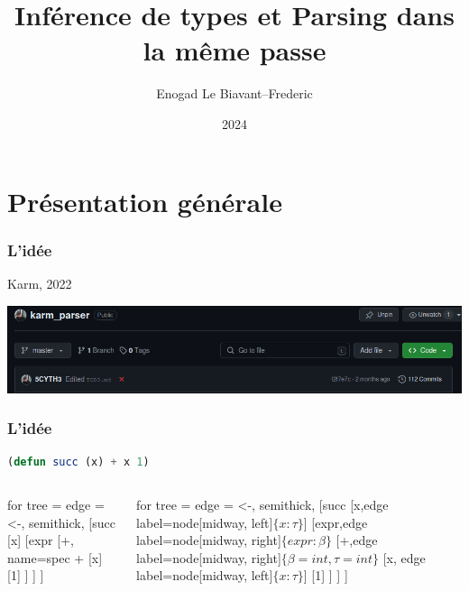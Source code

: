 \documentclass{beamer}
\title{Inférence de types et Parsing dans la même passe}
\author{Enogad Le Biavant--Frederic}
\institute{Alain René Lesage MP2I}
\date{2024}
\begin{document}
\frame{\titlepage}

\section{Présentation générale}
\begin{frame}
		\frametitle{L'idée}
		Karm, 2022
		\begin{center}
				\includegraphics[scale=0.25]{repo}
		\end{center}
		
\end{frame}

\begin{frame}[fragile]
		\frametitle{L'idée}
		\begin{lstlisting}[language=Lisp]
(defun succ (x) + x 1)
		\end{lstlisting}
		\begin{columns}
				\begin{column}{0.5\textwidth}
						\begin{center}
						\begin{forest}
								for tree = {
										edge = {<-, semithick},
								}
								[succ
										[x]
										[expr
												[+, name=spec +
														[x]
														[1]	
												]
										]
								]
						\end{forest}
						\end{center}
				\end{column}
				\begin{column}{0.5\textwidth}
						\begin{center}
						\begin{forest}
								for tree = {
										edge = {<-, semithick},
								}
								[succ
								[x,edge label={node[midway, left]{$\{x:\tau\}$}}]
										[expr,edge label={node[midway, right]{$\{expr:\beta\}$}}
												[+,edge label={node[midway, right]{$\{\beta = int, \tau = int\}$}}
														[x, edge label={node[midway, left]{$\{x:\tau\}$}}]
														[1]	
												]
										]
								]
						\end{forest}
						\end{center}
				\end{column}
		\end{columns}
\end{frame}
\end{document}
